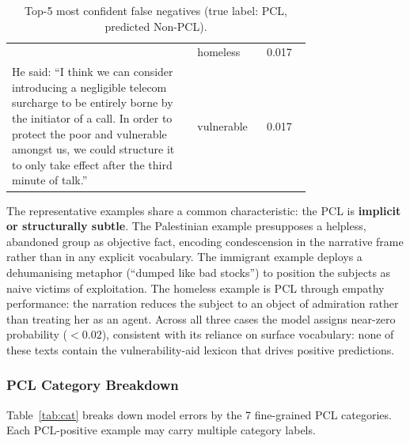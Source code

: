 \documentclass[11pt,a4paper]{article}
\begin{document}
\begin{table}[H]
\begin{tabular}{p{0.62\linewidth}p{0.13\linewidth}c}
                           & homeless         & 0.017          \\
        \addlinespace
        He said: ``I think we can consider introducing a negligible telecom surcharge to be entirely borne by the initiator of a call. In order to protect the poor and vulnerable amongst us, we could structure it to only take effect after the third minute of talk.''
                           & vulnerable       & 0.017          \\
        \bottomrule
    \end{tabular}
    \caption{Top-5 most confident false negatives (true label: PCL, predicted Non-PCL).}
    \label{tab:fn}
\end{table}

The representative examples share a common characteristic: the PCL is \textbf{implicit or structurally subtle}. The Palestinian example presupposes a helpless, abandoned group as objective fact, encoding condescension in the narrative frame rather than in any explicit vocabulary. The immigrant example deploys a dehumanising metaphor (``dumped like bad stocks'') to position the subjects as naive victims of exploitation. The homeless example is PCL through empathy performance: the narration reduces the subject to an object of admiration rather than treating her as an agent. Across all three cases the model assigns near-zero probability ($< 0.02$), consistent with its reliance on surface vocabulary: none of these texts contain the vulnerability-aid lexicon that drives positive predictions.

\subsubsection{PCL Category Breakdown}

Table~\ref{tab:cat} breaks down model errors by the 7 fine-grained PCL categories. Each PCL-positive example may carry multiple category labels.
\end{document}
